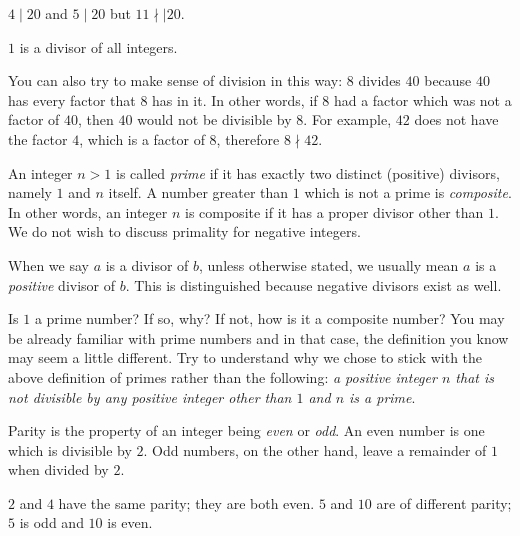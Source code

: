 \begin{example}
	$4 \mid 20$ and $5 \mid 20$ but $11\nmid\mid 20$.
\end{example}

\begin{example}
	$1$ is a divisor of all integers.
\end{example}

You can also try to make sense of division in this way: $8$ divides $40$ because $40$ has every factor that $8$ has in it. In other words, if $8$ had a factor which was not a factor of $40$, then $40$ would not be divisible by $8$. For example, $42$ does not have the factor $4$, which is a factor of $8$, therefore $8 \nmid 42$.

\begin{definition}
	An integer $n>1$ is called \textit{prime} if it has exactly two distinct (positive) divisors, namely $1$ and $n$ itself. A number greater than $1$ which is not a prime is \textit{composite}. In other words, an integer $n$ is composite if it has a proper divisor other than $1$. We do not wish to discuss primality for negative integers.
\end{definition}

\begin{note}
	When we say $a$ is a divisor of $b$, unless otherwise stated, we usually mean $a$ is a \textit{positive} divisor of $b$. This is distinguished because negative divisors exist as well.
\end{note}

\begin{question}
	Is $1$ a prime number? If so, why? If not, how is it a composite number? You may be already familiar with prime numbers and in that case, the definition you know may seem a little different. Try to understand why we chose to stick with the above definition of primes rather than the following: \textit{a positive integer $n$ that is not divisible by any positive integer other than $1$ and $n$ is a prime}.
\end{question}

\begin{definition}[Parity]
	Parity is the property of an integer being \textit{even} or \textit{odd}. An even number is one which is divisible by $2$. Odd numbers, on the other hand, leave a remainder of $1$ when divided by $2$.
\end{definition}

\begin{example}
	$2$ and $4$ have the same parity; they are both even. $5$ and $10$ are of different parity; $5$ is odd and $10$ is even.
\end{example}


